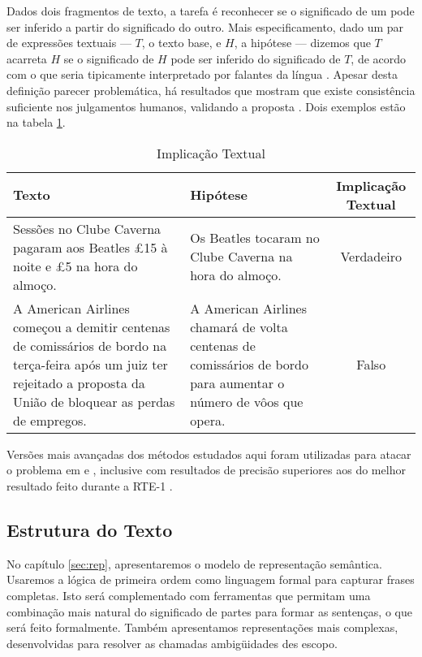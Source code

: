 	Dados dois fragmentos de texto, a tarefa é reconhecer se o significado de um pode ser inferido a partir do significado do outro. Mais especificamento, dado um par de expressões textuais --- $T$, o texto base, e $H$, a hipótese --- dizemos que $T$ acarreta $H$ se o significado de $H$ pode ser inferido do significado de $T$, de acordo com o que seria tipicamente interpretado por falantes da língua \citep[p.~1]{TextEnt}. Apesar desta definição parecer problemática, há resultados que mostram que existe consistência suficiente nos julgamentos humanos, validando a proposta \citep[p.~3]{TextEntBook}. Dois exemplos estão na tabela \ref{table:textent}. 
	
	\begin{table}
	\begin{center}
	\begin{tabular}{|p{5cm}|p{5cm}|c|}
	\hline Texto & Hipótese & Implicação Textual \\ 
	\hline  Sessões no Clube Caverna pagaram aos Beatles £15 à noite e £5 na hora do almoço. & Os Beatles tocaram no Clube Caverna na hora do almoço. & Verdadeiro \\ 
	\hline A American Airlines começou a demitir centenas de comissários de bordo na terça-feira após um juiz ter rejeitado a proposta da União de bloquear as perdas de empregos. & A American Airlines chamará de volta centenas de comissários de bordo para aumentar o número de vôos que opera. &  Falso \\
	\hline
	\end{tabular} 
	\end{center}
	\caption{Implicação Textual}
	\label{table:textent}
	\end{table}
	
	Versões mais avançadas dos métodos estudados aqui foram utilizadas para atacar o problema em \citet{BosMarkert2005} e \citet{BosMarkert2006}, inclusive com resultados de precisão superiores aos do melhor resultado feito durante a RTE-1 \citep[p.~89]{TextEntBook}.

\FloatBarrier
\subsection{Estrutura do Texto} 

No capítulo \ref{sec:rep}, apresentaremos o modelo de representação semântica. Usaremos a lógica de primeira ordem como linguagem formal para capturar frases completas. Isto será complementado com ferramentas que permitam uma combinação mais natural do significado de partes para formar as sentenças, o que será feito formalmente. Também apresentamos representações mais complexas, desenvolvidas para resolver as chamadas ambigüidades des escopo.

